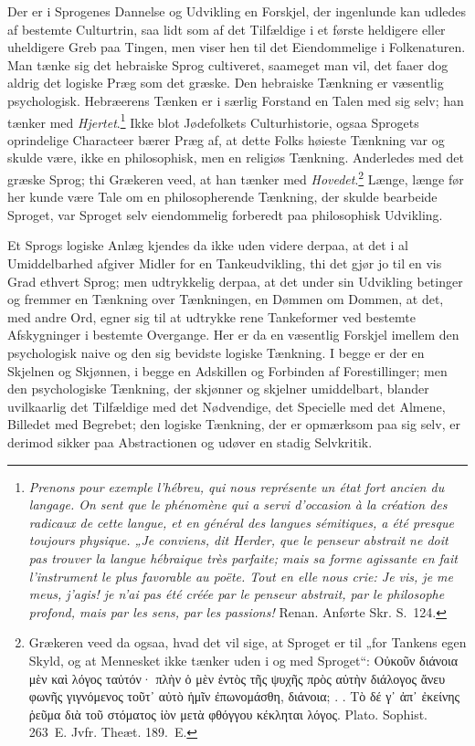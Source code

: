 \documentclass[12pt]{book}
\newcommand{\opage}[1]{\marginnote{\footnotesize\textit{[#1]}}}
\begin{document}
Der er i Sprogenes Dannelse og Udvikling en Forskjel, der ingenlunde kan udledes af bestemte Culturtrin, saa lidt som af det Tilfældige i et første heldigere eller uheldigere Greb paa Tingen, men viser hen til det Eiendommelige i Folkenaturen. Man tænke sig det hebraiske Sprog cultiveret, saameget man vil, det faaer dog aldrig det logiske Præg som det græske. Den hebraiske Tænkning er væsentlig psychologisk. Hebræerens Tænken er i særlig Forstand en Talen med sig selv; han tænker med \emph{Hjertet}.\footnote{\textit{Prenons pour exemple l'hébreu, qui nous représente un état fort ancien du langage. On sent que le phénomène qui a servi d'occasion à la création des radicaux de cette langue, et en général des langues sémitiques, a été presque toujours physique. „Je conviens, dit Herder, que le penseur abstrait ne doit pas %
trouver la langue hébraique très parfaite; mais sa forme agissante en fait l'instrument le plus favorable au poëte. Tout en elle nous crie: Je vis, je me meus, j'agis! je n'ai pas été créée par le penseur abstrait, par le philosophe profond, mais par les sens, par les passions!} Renan. Anførte Skr. S.~124.}%
{} Ikke blot Jødefolkets %
\opage{48}Culturhistorie, ogsaa Sprogets oprindelige Characteer bærer Præg af, at dette Folks høieste Tænkning var og skulde være, ikke en philosophisk, men en religiøs Tænkning. Anderledes med det græske Sprog; thi Grækeren veed, at han tænker med \emph{Hovedet}.\footnote{Grækeren veed da ogsaa, hvad det vil sige, at Sproget er til „for Tankens egen Skyld, og at Mennesket ikke tænker uden i og med Sproget“: Οὐκοῦν διάνοια μὲν καὶ λόγος ταὐτόν· πλὴν ὁ μὲν ἐντὸς τῆς ψυχῆς πρὸς αὑτὴν διάλογος ἄνευ φωνῆς γιγνόμενος τοῦτ᾽ αὐτὸ ἡμῖν ἐπωνομάσθη, διάνοια; . . Τὸ δέ γ᾽ ἀπ᾽ ἐκείνης ῥεῦμα διὰ τοῦ στόματος ἰὸν μετὰ φθόγγου κέκληται λόγος. Plato. Sophist. 263~E. Jvfr. Theæt. 189.~E.}%
{} Længe, længe før her kunde være Tale om en philosopherende Tænkning, der skulde bearbeide Sproget, var Sproget selv eiendommelig forberedt paa philosophisk Udvikling.

Et Sprogs logiske Anlæg kjendes da ikke uden videre derpaa, at det i al Umiddelbarhed afgiver Midler for en Tankeudvikling, thi det gjør jo til en vis Grad ethvert Sprog; men udtrykkelig derpaa, at det under sin Udvikling betinger og fremmer en Tænkning over Tænkningen, en Dømmen om Dommen, at det, med andre Ord, egner sig til at udtrykke rene Tankeformer ved bestemte Afskygninger i bestemte Overgange. Her er da en væsentlig Forskjel imellem den psychologisk naive og den sig bevidste logiske Tænkning. I begge er der en Skjelnen og Skjønnen, i begge en Adskillen og Forbinden af Forestillinger; men den psychologiske Tænkning, der skjønner og skjelner umiddelbart, blander uvilkaarlig det Tilfældige med det Nødvendige, det Specielle med det Almene, Billedet med Begrebet; den logiske Tænkning, der er opmærksom paa sig selv, er derimod sikker paa Abstractionen og udøver en stadig Selvkritik.
\end{document}
